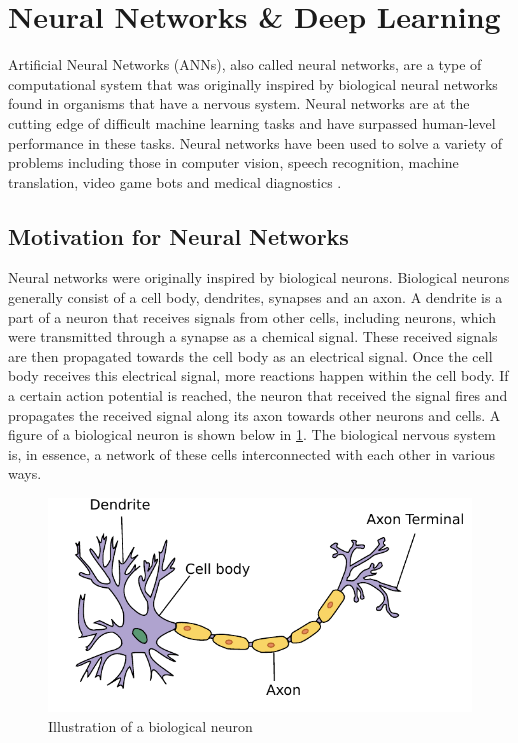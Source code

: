 
\section{Neural Networks \& Deep Learning}

Artificial Neural Networks (ANNs), also called neural networks, are a type of computational system that was originally inspired by biological neural networks found in organisms that have a nervous system. Neural networks are at the cutting edge of difficult machine learning tasks and have surpassed human-level performance in these tasks. Neural networks have been used to solve a variety of problems including those in computer vision, speech recognition, machine translation, video game bots and medical diagnostics \cite{imagenet_cnn,acoustic_modeling_speech,neural_translation,atari_deep_reinforcement_learning,3d_conf_for_alzheimers}.

\subsection{Motivation for Neural Networks}

Neural networks were originally inspired by biological neurons. Biological neurons generally consist of a cell body, dendrites, synapses and an axon. A dendrite is a part of a neuron that receives signals from other cells, including neurons, which were transmitted through a synapse as a chemical signal. These received signals are then propagated towards the cell body as an electrical signal. Once the cell body receives this electrical signal, more reactions happen within the cell body. If a certain action potential is reached, the neuron that received the signal fires and propagates the received signal along its axon towards other neurons and cells. A figure of a biological neuron is shown below in \cref{fig:bioneuron}. The biological nervous system is, in essence, a network of these cells interconnected with each other in various ways. 

\begin{figure}[!ht]
	\centering
	\includegraphics[height=0.35\linewidth]{pictures/Neuron.pdf}
	\caption[Illustration of a biological neuron]{Illustration of a biological neuron\cite{wiki:neuronpic}}\label{fig:bioneuron}  
\end{figure}

